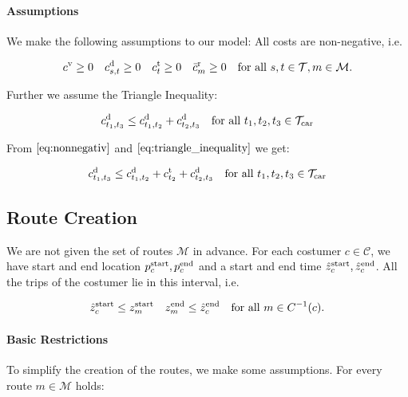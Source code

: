 \paragraph{Assumptions} \parfill

We make the following assumptions to our model: All costs are non-negative, i.e.

\begin{align}
\label{eq:nonnegativ}
	c^{\operatorname{v}}\geq 0 && c^{\operatorname{d}}_{s,t}\geq 0 && c^{\operatorname{t}}_t\geq 0 && \bar{c}^{\operatorname{r}}_m\geq 0 && \text{for all } s,t\in\mathcal{T}, m\in\mathcal{M}.
\end{align}

Further we assume the Triangle Inequality:

\begin{align}
\label{eq:triangle_inequality}
	c^{\operatorname{d}}_{t_1,t_3} \leq c^{\operatorname{d}}_{t_1,t_2} + c^{\operatorname{d}}_{t_2,t_3} && \text{for all } t_1,t_2,t_3\in\mathcal{T}_{\operatorname{car}}
\end{align}

From $\eqref{eq:nonnegativ}$ and $\eqref{eq:triangle_inequality}$ we get:

\begin{align}
\label{eq:triangle_inequality_ext}
	c^{\operatorname{d}}_{t_1,t_3} \leq c^{\operatorname{d}}_{t_1,t_2} + c^{\operatorname{t}}_{t_2} + c^{\operatorname{d}}_{t_2,t_3} && \text{for all } t_1,t_2,t_3\in\mathcal{T}_{\operatorname{car}}
\end{align}


\subsection{Route Creation}

We are not given the set of routes $\mathcal{M}$ in advance. For each costumer $c\in\mathcal{C}$, we have start and end location $p^{\operatorname{start}}_c, p^{\operatorname{end}}_c$ and a start and end time $\hat{z}^{\operatorname{start}}_c, \hat{z}^{\operatorname{end}}_c$. All the trips of the costumer lie in this interval, i.e.

\begin{align*}
	\hat{z}^{\operatorname{start}}_c \leq z^{\operatorname{start}}_m && z^{\operatorname{end}}_m \leq \hat{z}^{\operatorname{end}}_c && \text{for all } m\in C^{-1}(c).
\end{align*}

\paragraph{Basic Restrictions} \parfill

To simplify the creation of the routes, we make some assumptions. For every route $m\in\mathcal{M}$ holds:

